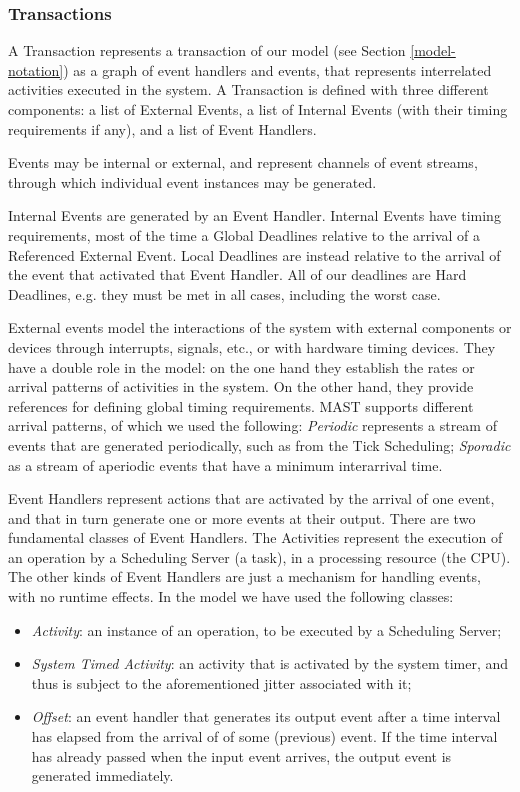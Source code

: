 \documentclass{article}
\begin{document}
\subsubsection{Transactions}

A Transaction represents a transaction of our model (see Section \ref{model-notation}) as a graph of event handlers and events, that represents interrelated activities executed in the system. A Transaction is defined with three different components: a list of External Events, a list of Internal Events (with their timing requirements if any), and a list of Event Handlers.

Events may be internal or external, and represent channels of event streams, through which individual event instances may be generated.

Internal Events are generated by an Event Handler. Internal Events have timing requirements, most of the time a Global Deadlines relative to the arrival of a Referenced External Event. Local Deadlines are instead relative to the arrival of the event that activated that Event Handler. All of our deadlines are Hard Deadlines, e.g. they must be met in all cases, including the worst case.

External events model the interactions of the system with external components or devices through interrupts, signals, etc., or with hardware timing devices. They have a double role in the model: on the one hand they establish the rates or arrival patterns of activities in the system. On the other hand, they provide references for defining global timing requirements. MAST supports different arrival patterns, of which we used the following: \textit{Periodic} represents a stream of events that are generated periodically, such as from the Tick Scheduling; \textit{Sporadic} as a stream of aperiodic events that have a minimum interarrival time.

Event Handlers represent actions that are activated by the arrival of one event, and that in turn generate one or more events at their output. There are two fundamental classes of Event Handlers. The Activities represent the execution of an operation by a Scheduling Server (a task), in a processing resource (the CPU). The other kinds of Event Handlers are just a mechanism for handling events, with no runtime effects. In the model we have used the following classes:

\begin{itemize}
   \item \textit{Activity}: an instance of an operation, to be executed by a Scheduling Server;
   \item \textit{System Timed Activity}: an activity that is activated by the system timer, and thus is subject to the aforementioned jitter associated with it;
   \item \textit{Offset}: an event handler that generates its output event after a time interval has elapsed from the arrival of of some (previous) event. If the time interval has already passed when the input event arrives, the output event is generated immediately.
\end{itemize}
\end{document}
